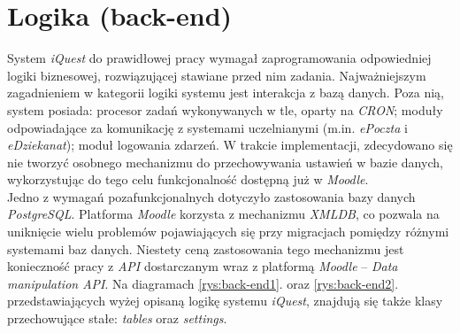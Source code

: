 \section{Logika (back-end)}
\label{Chapter66}

System \textit{iQuest} do prawidłowej pracy wymagał zaprogramowania odpowiedniej logiki biznesowej, rozwiązującej stawiane przed nim zadania. Najważniejszym zagadnieniem w kategorii logiki systemu jest interakcja z bazą danych. Poza nią, system posiada: procesor zadań wykonywanych w tle, oparty na \textit{CRON}; moduły odpowiadające za komunikację z systemami uczelnianymi (m.in. \textit{ePoczta} i \textit{eDziekanat}); moduł logowania zdarzeń. W trakcie implementacji, zdecydowano się nie tworzyć osobnego mechanizmu do przechowywania ustawień w bazie danych, wykorzystując do tego celu funkcjonalność dostępną już w \textit{Moodle}. \\

Jedno z wymagań pozafunkcjonalnych dotyczyło zastosowania bazy danych \textit{PostgreSQL}. Platforma \textit{Moodle} korzysta z mechanizmu \textit{XMLDB}, co pozwala na uniknięcie wielu problemów pojawiających się przy migracjach pomiędzy różnymi systemami baz danych. Niestety ceną zastosowania tego mechanizmu jest konieczność pracy z \textit{API} dostarczanym wraz z platformą \textit{Moodle} -- \textit{Data manipulation API}. Na diagramach \ref{rys:back-end1}. oraz \ref{rys:back-end2}. przedstawiających wyżej opisaną logikę systemu \textit{iQuest}, znajdują się także klasy przechowujące stałe: \textit{tables} oraz \textit{settings}. \\

